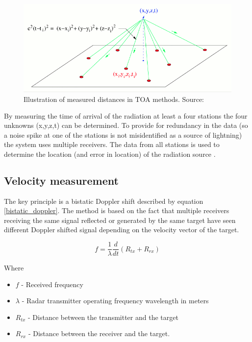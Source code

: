 \documentclass[twoside]{ctuthesis}
\theoremstyle{plain}
\theoremstyle{definition}
\theoremstyle{note}
\begin{document}
\begin{figure}
 \begin{center}
 \includegraphics[width=\linewidth]{./img/toa_fig.png}
 \caption{Illustration of measured distances in TOA methods. Source: \cite{NMLMA} }
  \label{fig:TOA_localization} 
 \end{center}
\end{figure}

By measuring the time of arrival of the radiation at least a four stations the four unknowns (x,y,z,t) can be determined. To provide for redundancy in the data (so a noise spike at one of the stations is not misidentified as a source of lightning) the system uses multiple receivers. The data from all stations is used to determine the location (and error in location) of the radiation source \cite{NMLMA}.

\subsection{Velocity measurement}

The key principle is a bistatic Doppler shift described by equation \ref{bistatic_doppler}. The method is based on the fact that multiple receivers receiving the same signal reflected or generated by the same target have seen different Doppler shifted signal depending on the velocity vector of the target.  

\begin{equation}
f = \frac{1}{\lambda} \frac{d}{dt} \left( R_{tx} + R_{rx} \right)
\label{bistatic_doppler}
\end{equation}

Where 
\begin{itemize}
\item $f$ - Received frequency
\item $\lambda$ - Radar transmitter operating frequency wavelength in meters
\item $R_{tx}$ - Distance between the transmitter and the target
\item $R_{rx}$ - Distance between the receiver and the target.
\end{itemize}
\end{document}
